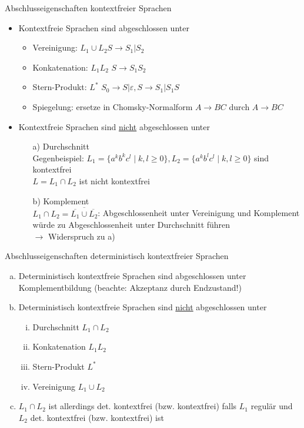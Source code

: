 \begin{frame}{Abschlusseigenschaften kontextfreier Sprachen}
	\begin{itemize}
		\item Kontextfreie Sprachen sind abgeschlossen unter
		\begin{itemize}
			\item Vereinigung: $L_1\cup L_2$\qquad $S \rightarrow S_1|S_2$
			\item Konkatenation: $L_1L_2$ \qquad $S\rightarrow S_1S_2$
			\item Stern-Produkt: $L^*$ \qquad $S_0\rightarrow S|\varepsilon, S\rightarrow S_1|S_1S$
			\item Spiegelung: ersetze in Chomsky-Normalform $A\rightarrow BC$ durch $A \rightarrow BC$
		\end{itemize}
		\item Kontextfreie Sprachen sind \underline{nicht} abgeschlossen unter
		\begin{itemize}
			\item [a)] Durchschnitt\\
			Gegenbeispiel: $L_1=\{a^kb^kc^l\mid k,l\geq 0\}, L_2=\{a^kb^lc^l\mid k,l\geq 0\}$ sind kontextfrei\\
			$L=L_1\cap L_2$ ist nicht kontextfrei
			\item [b)] Komplement\\
			$L_1 \cap L_2 = \overline{\overline{L_1} \cup \overline{L_2}}$: Abgeschlossenheit unter Vereinigung und Komplement würde zu Abgeschlossenheit unter Durchschnitt führen\\
			$\rightarrow$ Widerspruch zu a) \lightning
			
		\end{itemize}
	\end{itemize}
\end{frame}

\begin{frame}{Abschlusseigenschaften deterministisch kontextfreier Sprachen}
	\begin{enumerate}[a)]
		\item Deterministisch kontextfreie Sprachen sind abgeschlossen unter Komplementbildung (beachte: Akzeptanz durch Endzustand!)
		\item Deterministisch kontextfreie Sprachen sind \underline{nicht} abgeschlossen unter
		\begin{enumerate}[i.]
			\item Durchschnitt $L_1 \cap L_2$
			\item Konkatenation $L_1L_2$
			\item Stern-Produkt $L^*$
			\item Vereinigung $L_1 \cup L_2$
		\end{enumerate}
		\item $L_1 \cap L_2$ ist allerdings det. kontextfrei (bzw. kontextfrei) falls $L_1$ regulär und $L_2$ det. kontextfrei (bzw. kontextfrei) ist
	\end{enumerate}
\end{frame}